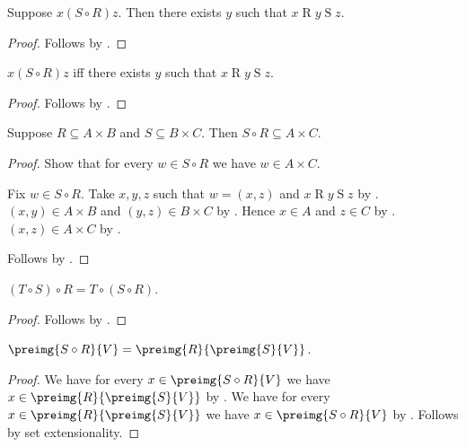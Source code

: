 \begin{proposition}\label{circ_elem_elim}
    Suppose $x\mathrel{(S\circ R)} z$.
    Then there exists $y$ such that $x\mathrel{R} y\mathrel{S} z$.
\end{proposition}
\begin{proof}
    Follows by .
\end{proof}

\begin{proposition}\label{circ_iff}
    $x\mathrel{(S\circ R)} z$ iff there exists $y$ such that $x\mathrel{R} y\mathrel{S} z$.
\end{proposition}
\begin{proof}
    Follows by .
\end{proof}

\begin{proposition}\label{circ_type}
    Suppose $R\subseteq A\times B$ and $S\subseteq B\times C$.
    Then $S\circ R\subseteq A\times C$.
\end{proposition}
\begin{proof}
    Show that for every $w\in S\circ R$ we have $w\in A\times C$.
    \begin{subproof}
        Fix $w\in S\circ R$.
        Take $x,y,z$ such that $w=(x,z)$ and
            $x\mathrel{R}y\mathrel{S}z$ by .
        $(x,y)\in A\times B$ and $(y,z)\in B\times C$
            by .
        Hence $x\in A$ and $z\in C$ by .
        $(x,z)\in A\times C$ by .
    \end{subproof}
    Follows by .
\end{proof}

\begin{proposition}\label{circ_assoc}
    $(T\circ S)\circ R = T\circ (S\circ R)$.
\end{proposition}
\begin{proof}
    Follows by .
\end{proof}

\begin{proposition}\label{preimg_circ}
    $\preimg{S\circ R}{V}=\preimg{R}{\preimg{S}{V}}$.
\end{proposition}
\begin{proof}
    We have for every $x\in\preimg{S\circ R}{V}$
        we have $x\in\preimg{R}{\preimg{S}{V}}$
        by .
    We have for every $x\in\preimg{R}{\preimg{S}{V}}$
        we have $x\in\preimg{S\circ R}{V}$
        by .
    Follows by set extensionality.
\end{proof}

